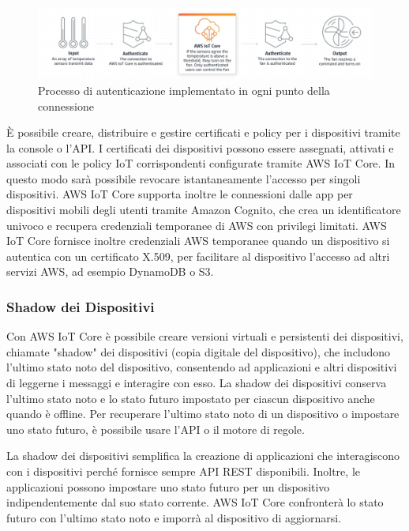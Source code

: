\begin{figure}
	\begin{center}
		\includegraphics[width=0.9\columnwidth]{images/aws_auth}
	\end{center}
	\caption{Processo di autenticazione implementato in ogni punto della connessione}
	\label{fig:aws_auth}
\end{figure}

È possibile creare, distribuire e gestire certificati e policy per i dispositivi tramite la console o l'API. I certificati dei dispositivi possono essere assegnati, attivati e associati con le policy IoT corrispondenti configurate tramite AWS IoT Core. In questo modo sarà possibile revocare istantaneamente l'accesso per singoli dispositivi. AWS IoT Core supporta inoltre le connessioni dalle app per dispositivi mobili degli utenti tramite Amazon Cognito, che crea un identificatore univoco e recupera credenziali temporanee di AWS con privilegi limitati. AWS IoT Core fornisce inoltre credenziali AWS temporanee quando un dispositivo si autentica con un certificato X.509, per facilitare al dispositivo l'accesso ad altri servizi AWS, ad esempio DynamoDB o S3.

\subsubsection{Shadow dei Dispositivi}
Con AWS IoT Core è possibile creare versioni virtuali e persistenti dei dispositivi, chiamate "shadow" dei dispositivi (copia digitale del dispositivo), che includono l'ultimo stato noto del dispositivo, consentendo ad applicazioni e altri dispositivi di leggerne i messaggi e interagire con esso. La shadow dei dispositivi conserva l'ultimo stato noto e lo stato futuro impostato per ciascun dispositivo anche quando è offline. Per recuperare l'ultimo stato noto di un dispositivo o impostare uno stato futuro, è possibile usare l'API o il motore di regole.

La shadow dei dispositivi semplifica la creazione di applicazioni che interagiscono con i dispositivi perché fornisce sempre API REST disponibili. Inoltre, le applicazioni possono impostare uno stato futuro per un dispositivo indipendentemente dal suo stato corrente. AWS IoT Core confronterà lo stato futuro con l'ultimo stato noto e imporrà al dispositivo di aggiornarsi.

